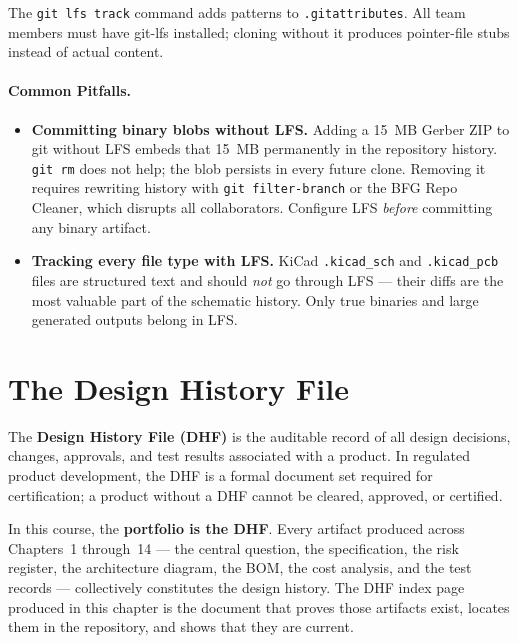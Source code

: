 The \texttt{git lfs track} command adds patterns to \texttt{.gitattributes}.
All team members must have git-lfs installed; cloning without it produces pointer-file
stubs instead of actual content.

\paragraph{Common Pitfalls.}
\begin{itemize}
  \item \textbf{Committing binary blobs without LFS.}
        Adding a 15~MB Gerber ZIP to git without LFS embeds that 15~MB permanently in the
        repository history.
        \texttt{git rm} does not help; the blob persists in every future clone.
        Removing it requires rewriting history with \texttt{git filter-branch} or the
        BFG Repo Cleaner, which disrupts all collaborators.
        Configure LFS \emph{before} committing any binary artifact.
  \item \textbf{Tracking every file type with LFS.}
        KiCad \texttt{.kicad\_sch} and \texttt{.kicad\_pcb} files are structured text
        and should \emph{not} go through LFS --- their diffs are the most valuable part
        of the schematic history.
        Only true binaries and large generated outputs belong in LFS.
\end{itemize}

\section{The Design History File}
\label{sec:ch13-dhf}

The \textbf{Design History File (DHF)} is the
auditable record of all design decisions, changes, approvals, and test results associated
with a product.
In regulated product development, the DHF is a formal document set required for
certification; a product without a DHF cannot be cleared, approved, or certified.

In this course, the \textbf{portfolio is the DHF}.
Every artifact produced across Chapters~1 through~14 --- the central question, the
specification, the risk register, the architecture diagram, the BOM, the cost analysis, and
the test records --- collectively constitutes the design history.
The DHF index page produced in this chapter is the document that proves those artifacts
exist, locates them in the repository, and shows that they are current.

